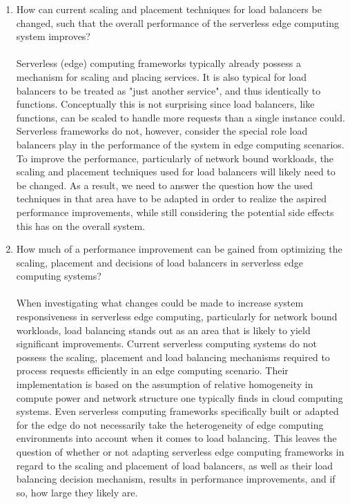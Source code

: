 \documentclass[draft,final]{vutinfth} %
\begin{document}
\begin{enumerate}
        \item How can current scaling and placement techniques for load balancers be changed, such that the overall performance of the serverless edge computing system improves?\\\\
    Serverless (edge) computing frameworks typically already possess a mechanism for scaling and placing services. It is also typical for load balancers to be treated as "just another service", and thus identically to functions\cite{openfaas}.
    Conceptually this is not surprising since load balancers, like functions, can be scaled to handle more requests than a single instance could.
    Serverless frameworks do not, however, consider the special role load balancers play in the performance of the system in edge computing scenarios.
    To improve the performance, particularly of network bound workloads, the scaling and placement techniques used for load balancers will likely need to be changed. As a result, we need to answer the question how the used techniques in that area have to be adapted in order to realize the aspired performance improvements, while still considering the potential side effects this has on the overall system.

        \item How much of a performance improvement can be gained from optimizing the scaling, placement and decisions of load balancers in serverless edge computing systems?\\\\
    When investigating what changes could be made to increase system responsiveness in serverless edge computing, particularly for network bound workloads, load balancing stands out as an area that is likely to yield significant improvements. Current serverless computing systems do not possess the scaling, placement and load balancing mechanisms required to process requests efficiently in an edge computing scenario. Their implementation is based on the assumption of relative homogeneity in compute power and network structure one typically finds in cloud computing systems. Even serverless computing frameworks specifically built or adapted for the edge do not necessarily take the heterogeneity of edge computing environments into account when it comes to load balancing\cite{skippy}.
    This leaves the question of whether or not adapting serverless edge computing frameworks in regard to the scaling and placement of load balancers, as well as their load balancing decision mechanism, results in performance improvements, and if so, how large they likely are.


\end{enumerate}
\end{document}
